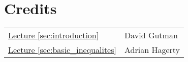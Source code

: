 \documentclass{amsproc}
\newcommand{\fref}[2]{\hyperref[#2]{#1 \ref*{#2}}}
\begin{document}

\appendix
\newpage
\section*{Credits}
\begin{tabular}{ll}
	\fref{Lecture}{sec:introduction}
	&David Gutman
	\\
	\fref{Lecture}{sec:basic_inequalites}
	&Adrian Hagerty
\end{tabular}



\end{document}
